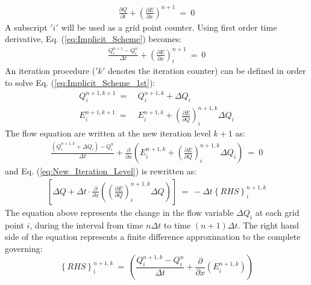 \documentclass[conf]{new-aiaa}
\begin{document}
\begin{equation}
	\begin{split}
		\label{eq:Implicit_Scheme}
  			\frac{\partial{Q}}{\partial{t}} +\left(\frac{\partial{E}}{\partial{x}}\right)^{n+1}~=~0
	\end{split}
\end{equation}
A subscript $'i'$ will be used as a grid point counter. Using first order time derivative, Eq. (\ref{eq:Implicit_Scheme}) becomes:
\begin{equation}
	\begin{split}
		\label{eq:Implicit_Scheme_1st}
  			\frac{Q_i^{n+1}-Q_i^{n}}{\Delta{t}} +\left(\frac{\partial{E}}{\partial{x}}\right)^{n+1}_i~=~0
	\end{split}
\end{equation}
An iteration procedure ($'k'$ denotes the iteration counter) can be defined in order to solve Eq. (\ref{eq:Implicit_Scheme_1st}):
\begin{equation}
	\label{eq:TS_Q_E}
	\begin{split}
	Q_i^{n+1, k+1}~=&~Q_i^{n+1, k}+\Delta{Q}_i \\
	E_i^{n+1, k+1}~=&~E_i^{n+1, k} + \left(\frac{\partial{E}}{\partial{Q}} \right)^{n+1, k}_i\Delta{Q}_i
	\end{split}
\end{equation}
The flow equation are written at the new iteration level $k+1$ as:
\begin{equation}
	\begin{split}
		\label{eq:New_Iteration_Level}
  			\frac{\left(Q_i^{n+1, k}+\Delta{Q}_i\right)-Q_i^n}{\Delta{t}}+\frac{\partial}{\partial{x}}\left(E_i^{n+1, k} + \left(\frac{\partial{E}}{\partial{Q}} \right)^{n+1, k}_i\Delta{Q}_i\right)~=~0
	\end{split}
\end{equation}
and Eq. (\ref{eq:New_Iteration_Level}) is rewritten as:
\begin{equation}
	\begin{split}
		\label{eq:NS_DeltaForm}
  			\left[\Delta{Q}+\Delta{t}\cdot\frac{\partial}{\partial{x}}\left(\left(\frac{\partial{E}}{\partial{Q}} \right)_i^{n+1,k}\Delta{Q} \right)\right]~=~-\Delta{t}\left\{RHS\right\}_i^{n+1, k}
	\end{split}
\end{equation}
The equation above represents the change in the flow variable $\Delta{Q_i}$ at each grid point $i$, during the interval from time $n\Delta{t}$ to time $(n+1)\Delta{t}$. The right hand side of the equation represents a finite difference approximation to the complete governing:
\begin{equation*}
	\left\{RHS\right\}_i^{n+1, k}~=~\left(\frac{Q_i^{n+1, k}-Q_i^n}{\Delta{t}}+\frac{\partial}{\partial{x}}\left(E_i^{n+1, k} \right)\right)
\end{equation*}
\end{document}
